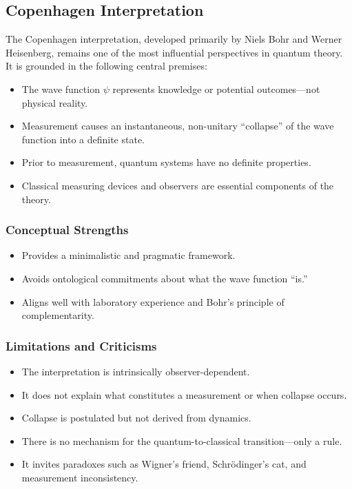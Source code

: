 \documentclass[12pt]{article}
\begin{document}
\subsection{Copenhagen Interpretation}

The Copenhagen interpretation, developed primarily by Niels Bohr and Werner Heisenberg, remains one of the most influential perspectives in quantum theory. It is grounded in the following central premises:

\begin{itemize}
    \item The wave function \( \psi \) represents knowledge or potential outcomes—not physical reality.
    \item Measurement causes an instantaneous, non-unitary “collapse” of the wave function into a definite state.
    \item Prior to measurement, quantum systems have no definite properties.
    \item Classical measuring devices and observers are essential components of the theory.
\end{itemize}

\subsubsection*{Conceptual Strengths}

\begin{itemize}
    \item Provides a minimalistic and pragmatic framework.
    \item Avoids ontological commitments about what the wave function “is.”
    \item Aligns well with laboratory experience and Bohr's principle of complementarity.
\end{itemize}

\subsubsection*{Limitations and Criticisms}

\begin{itemize}
    \item The interpretation is intrinsically observer-dependent.
    \item It does not explain what constitutes a measurement or when collapse occurs.
    \item Collapse is postulated but not derived from dynamics.
    \item There is no mechanism for the quantum-to-classical transition—only a rule.
    \item It invites paradoxes such as Wigner’s friend, Schrödinger’s cat, and measurement inconsistency.
\end{itemize}
\end{document}
